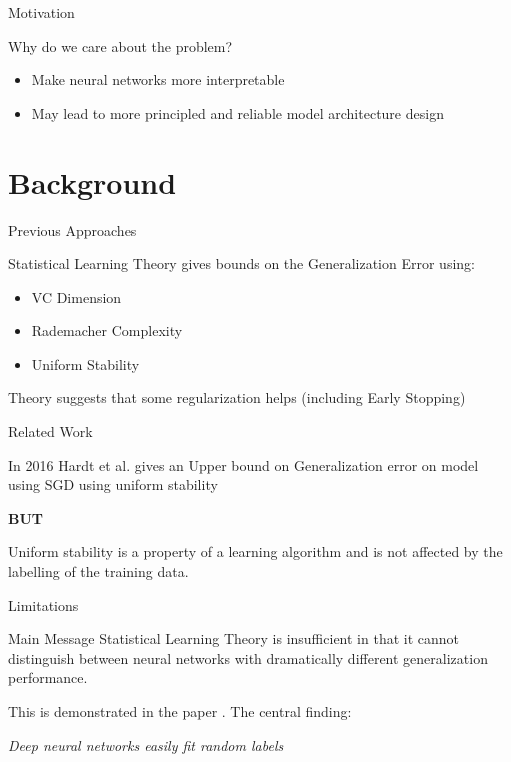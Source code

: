 \documentclass[10pt]{beamer}
\begin{document}
\begin{frame}[fragile]{Motivation}
\begin{center}
	Why do we care about the problem?
\end{center}
\begin{itemize}
	\item Make neural networks more interpretable
	\item May lead to more principled and reliable model architecture design
\end{itemize}


\end{frame}	

\section{Background}

\begin{frame}[fragile]{Previous Approaches}
	
Statistical Learning Theory gives bounds on the Generalization Error using:
\begin{itemize}
	\item VC Dimension 
	\item Rademacher Complexity
	\item Uniform Stability
\end{itemize}
Theory suggests that some regularization helps (including Early Stopping)
\end{frame}	

\begin{frame}[fragile]{Related Work}

In 2016 Hardt et al. gives an Upper bound on Generalization error on model using SGD using uniform stability \cite{DBLP:journals/corr/HardtRS15}

\textbf{BUT}

Uniform stability is a property of a learning algorithm and is not affected by the labelling of the training data.

\end{frame}

\begin{frame}[fragile]{Limitations}
\begin{alertblock}{Main Message}
	Statistical Learning Theory is insufficient in that it cannot distinguish between neural networks with dramatically different generalization performance.
\end{alertblock}

This is demonstrated in the paper \cite{DBLP:journals/corr/ZhangBHRV16}. The central finding:

\begin{center}
	\emph{Deep neural networks easily fit random labels}
\end{center}

\end{frame}	
\end{document}
